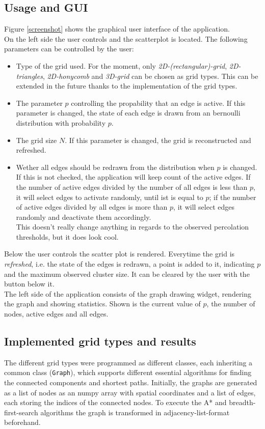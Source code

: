 \documentclass[a4paper,fleqn]{article}
\begin{document}
\subsection*{Usage and GUI}
Figure \ref{screenshot} shows the graphical user interface of the application.\\
On the left side the user controls and the scatterplot is located. The following parameters can be controlled by the user:
\begin{itemize}
	\item Type of the grid used. For the moment, only \emph{2D-(rectangular)-grid}, \emph{2D-triangles}, \emph{2D-honycomb} and \emph{3D-grid} can be chosen as grid types. This can be extended in the future thanks to the implementation of the grid types.
	\item The parameter $p$ controlling the propability that an edge is active. If this parameter is changed, the state of each edge is drawn from an bernoulli distribution with probability $p$.
	\item The grid size $N$. If this parameter is changed, the grid is reconstructed and refreshed.
	\item Wether all edges should be redrawn from the distribution when $p$ is changed. If this is not checked, the application will keep count of the active edges. If the number of active edges divided by the number of all edges is less than $p$, it will select edges to activate randomly, until ist is equal to $p$; if the number of active edges divided by all edges is more than $p$, it will select edges randomly and deactivate them accordingly. \\
	This doesn't really change anything in regards to the observed percolation thresholds, but it does look cool.
\end{itemize}
Below the user controls the scatter plot is rendered. Everytime the grid is \emph{refreshed}, i.e. the state of the edges is redrawn, a point is added to it, indicating $p$ and the maximum observed cluster size. It can be cleared by the user with the button below it.\\
The left side of the application consists of the graph drawing widget, rendering the graph and showing statistics. Shown is the current value of $p$, the number of nodes, active edges and all edges.
\subsection*{Implemented grid types and results}
The different grid types were programmed as different classes, each inheriting a common class (\verb|Graph|), which supports different essential algorithms for finding the connected 
components and shortest paths. Initially, the graphs are generated as a list of nodes as an numpy array with spatial coordinates and a list of edges, each storing the indices of the connected nodes.
To execute the A* and breadth-first-search algorithms the graph is transformed in adjacency-list-format beforehand.
\end{document}
